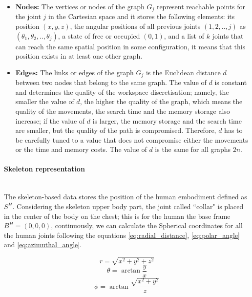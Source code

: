 \documentclass[thesis]{mas_proposal}
\begin{document}
	\begin{itemize}
		
		\item \textbf{Nodes:} The vertices or nodes of the graph $G_j$ represent reachable points for the joint $j$ in the Cartesian space and it stores the following elements: its position $(x, y, z)$, the angular positions of all previous joints $(1,2,..,j)$ as $(\theta_1, \theta_2,..,\theta_j)$, a state of free or occupied $(0, 1)$, and a list of $k$ joints that can reach the same spatial position in some configuration, it means that this position exists in at least one other graph. 	
		
		\item \textbf{Edges:} The links or edges of the graph $G_j$ is the Euclidean distance $d$ between two nodes that belong to the same graph. The value of $d$ is constant and determines the quality of the workspace discretisation; namely, the smaller the value of $d$, the higher the quality of the graph, which means the quality of the movements, the search time and the memory storage also increase; if the value of $d$ is larger, the memory storage and the search time are smaller, but the quality of the path is compromised. Therefore, $d$ has to be carefully tuned to a value that does not compromise either the movements or the time and memory costs. The value of $d$ is the same for all graphs $2n$.
		
	\end{itemize}  
  
   	\paragraph{Skeleton representation}\mbox{} \\ [10pt]
   		The skeleton-based data stores the position of the human embodiment defined as $S^H$. Considering the skeleton upper body part, the joint called ``collar" is placed in the center of the body on the chest; this is for the human the base frame $B^H = (0, 0, 0)$, continuously, we can calculate the Spherical coordinates for all the human joints following the equations \ref{eq:radial_distance}, \ref{eq:polar_angle} and \ref{eq:azimuthal_angle}.
   	
	   	\begin{equation}
	   	r = \sqrt{x^2 + y^2 + z^2}
	   	\label{eq:radial_distance}
	   	\end{equation}
	   	\begin{equation}
	   	\theta = \arctan \frac{y}{x}
	   	\label{eq:polar_angle}
	   	\end{equation}
	   	\begin{equation}
	   	\phi = \arctan \frac{\sqrt{x^2 + y^2}}{z}
	   	\label{eq:azimuthal_angle}
	   	\end{equation}
	   	
\end{document}
